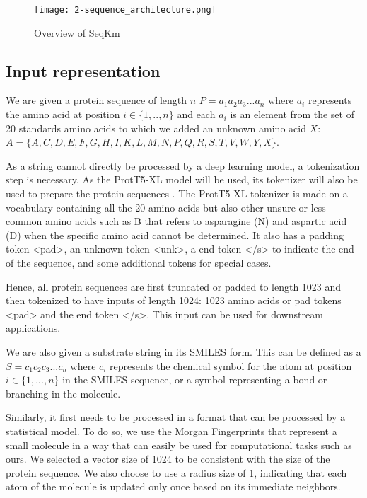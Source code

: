 \begin{figure}
  \centering
  \texttt{[image: 2-sequence\_architecture.png]}
  \caption{Overview of SeqKm}
  \label{fig:seqkm}
\end{figure}

\subsection{Input representation}

We are given a protein sequence of length $n$ $P=a_1a_2a_3...a_n$ where $a_i$ represents the amino acid
at position $i\in\{1,..,n\}$ and each $a_i$ is an element from the set of 20 standards amino acids to
which we added an unknown amino acid $X$: $A=\{A,C,D,E,F,G,H,I,K,L,M,N,P,Q,R,S,T,V,W,Y,X\}$.

As a string cannot directly be processed by a deep learning model, a tokenization step is necessary. As
the ProtT5-XL model will be used, its tokenizer will also be used to prepare the protein sequences \cite{prottrans}.
The ProtT5-XL tokenizer is made on a vocabulary containing all the 20 amino acids but also other unsure or less
common amino acids such as B that refers to asparagine (N) and aspartic acid (D) when the specific
amino acid cannot be determined. It also has a padding token <pad>, an unknown token <unk>, a end
token </s> to indicate the end of the sequence, and some additional tokens for special cases.

Hence, all protein sequences are first truncated or padded to length 1023 and then tokenized to have inputs of
length 1024: 1023 amino acids or pad tokens <pad> and the end token </s>. This input can be used for downstream
applications.

We are also given a substrate string in its SMILES form. This can be defined as a $S=c_1c_2c_3...c_n$
where $c_i$ represents the chemical symbol for the atom at position $i\in\{1,...,n\}$ in the SMILES
sequence, or a symbol representing a bond or branching in the molecule.

Similarly, it first needs to be processed in a format that can be processed by a statistical model. To do so,
we use the Morgan Fingerprints that represent a small molecule in a way that can easily be used for computational
tasks such as ours. We selected a vector size of 1024 to be consistent with the size of the protein sequence. We
also choose to use a radius size of 1, indicating that each atom of the molecule is updated only once based on its
immediate neighbors.

